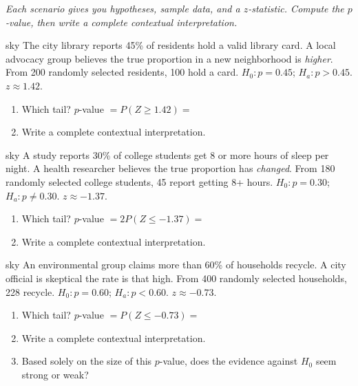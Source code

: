 \documentclass[10pt]{article}
\begin{document}
\namepartnerperiod

\vspace{0.15in}

\textit{Each scenario gives you hypotheses, sample data, and a $z$-statistic. Compute the
$p$-value, then write a complete contextual interpretation.}

\begin{scenariobox}{sky}
The city library reports 45\% of residents hold a valid library card. A local advocacy group
believes the true proportion in a new neighborhood is \emph{higher}. From 200 randomly selected
residents, 100 hold a card. $H_0: p = 0.45$; $H_a: p > 0.45$. $z \approx 1.42$.

\begin{enumerate}[label=\alph*.]
  \item Which tail? \blank{3cm} \quad $p$-value $= P(Z \ge 1.42) = $ \blank{3cm}
  \item Write a complete contextual interpretation.
\end{enumerate}
\end{scenariobox}

\begin{scenariobox}{sky}
A study reports 30\% of college students get 8 or more hours of sleep per night. A health
researcher believes the true proportion has \emph{changed}. From 180 randomly selected
college students, 45 report getting 8+ hours. $H_0: p = 0.30$; $H_a: p \ne 0.30$. $z \approx -1.37$.

\begin{enumerate}[label=\alph*.]
  \item Which tail? \blank{3cm} \quad $p$-value $= 2P(Z \le -1.37) = $ \blank{3cm}
  \item Write a complete contextual interpretation.
\end{enumerate}
\end{scenariobox}

\begin{scenariobox}{sky}
An environmental group claims more than 60\% of households recycle. A city official is
skeptical the rate is that high. From 400 randomly selected households, 228 recycle.
$H_0: p = 0.60$; $H_a: p < 0.60$. $z \approx -0.73$.

\begin{enumerate}[label=\alph*.]
  \item Which tail? \blank{3cm} \quad $p$-value $= P(Z \le -0.73) = $ \blank{3cm}
  \item Write a complete contextual interpretation.
  \item Based solely on the size of this $p$-value, does the evidence against $H_0$ seem
        strong or weak? 
\end{enumerate}
\end{scenariobox}
\end{document}

